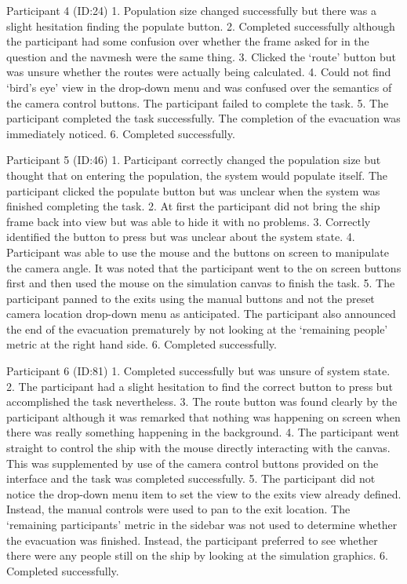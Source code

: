 \documentclass{article}
\begin{document}
Participant 4 (ID:24)
1. Population size changed successfully but there was a slight hesitation finding the populate button.
2. Completed successfully although the participant had some confusion over whether the frame asked for in the question and the navmesh were the same thing.
3. Clicked the ‘route’ button but was unsure whether the routes were actually being calculated.
4. Could not find ‘bird’s eye’ view in the drop-down menu and was confused over the semantics of the camera control buttons. The participant failed to complete the task.
5. The participant completed the task successfully. The completion of the evacuation was immediately noticed.
6. Completed successfully.

Participant 5 (ID:46)
1. Participant correctly changed the population size but thought that on entering the population, the system would populate itself. The participant clicked the populate button but was unclear when the system was finished completing the task.
2. At first the participant did not bring the ship frame back into view but was able to hide it with no problems.
3. Correctly identified the button to press but was unclear about the system state.
4. Participant was able to use the mouse and the buttons on screen to manipulate the camera angle. It was noted that the participant went to the on screen buttons first and then used the mouse on the simulation canvas to finish the task.
5. The participant panned to the exits using the manual buttons and not the preset camera location drop-down menu as anticipated. The participant also announced the end of the evacuation prematurely by not looking at the ‘remaining people’ metric at the right hand side.
6. Completed successfully.  

Participant 6 (ID:81)
1. Completed successfully but was unsure of system state.
2. The participant had a slight hesitation to find the correct button to press but accomplished the task nevertheless.
3. The route button was found clearly by the participant although it was remarked that nothing was happening on screen when there was really something happening in the background.
4. The participant went straight to control the ship with the mouse directly interacting with the canvas. This was supplemented by use of the camera control buttons provided on the interface and the task was completed successfully.
5. The participant did not notice the drop-down menu item to set the view to the exits view already defined. Instead, the manual controls were used to pan to the exit location. The ‘remaining participants’ metric in the sidebar was not used to determine whether the evacuation was finished. Instead, the participant preferred to see whether there were any people still on the ship by looking at the simulation graphics.
6. Completed successfully.
\end{document}
